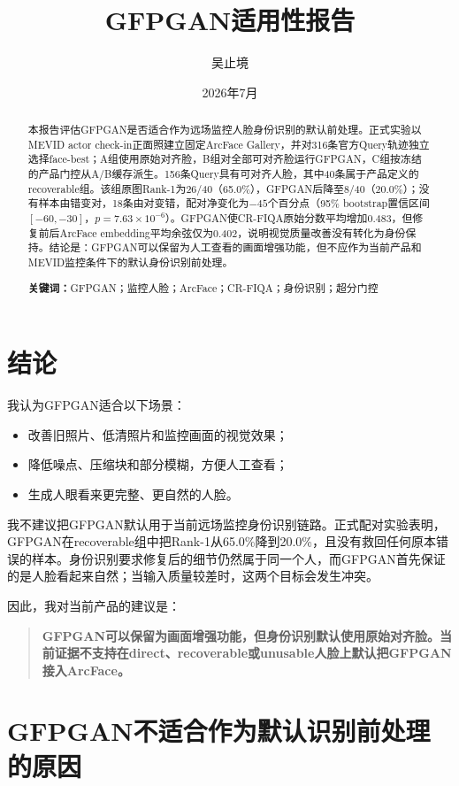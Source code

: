 \documentclass[UTF8,a4paper,11pt]{ctexart}
\title{\textbf{GFPGAN适用性报告}}
\author{吴止境}
\date{2026年7月}
\begin{document}
\pagestyle{plain}
\maketitle

\begin{abstract}
本报告评估GFPGAN是否适合作为远场监控人脸身份识别的默认前处理。正式实验以MEVID actor check-in正面照建立固定ArcFace Gallery，并对316条官方Query轨迹独立选择face-best；A组使用原始对齐脸，B组对全部可对齐脸运行GFPGAN，C组按冻结的产品门控从A/B缓存派生。156条Query具有可对齐人脸，其中40条属于产品定义的recoverable组。该组原图Rank-1为26/40（65.0\%），GFPGAN后降至8/40（20.0\%）；没有样本由错变对，18条由对变错，配对净变化为$-45$个百分点（95\% bootstrap置信区间$[-60,-30]$，$p=7.63\times10^{-6}$）。GFPGAN使CR-FIQA原始分数平均增加0.483，但修复前后ArcFace embedding平均余弦仅为0.402，说明视觉质量改善没有转化为身份保持。结论是：GFPGAN可以保留为人工查看的画面增强功能，但不应作为当前产品和MEVID监控条件下的默认身份识别前处理。

\textbf{关键词：}GFPGAN；监控人脸；ArcFace；CR-FIQA；身份识别；超分门控
\end{abstract}

\section{结论}

我认为GFPGAN适合以下场景：

\begin{itemize}[leftmargin=2em]
  \item 改善旧照片、低清照片和监控画面的视觉效果；
  \item 降低噪点、压缩块和部分模糊，方便人工查看；
  \item 生成人眼看来更完整、更自然的人脸。
\end{itemize}

我不建议把GFPGAN默认用于当前远场监控身份识别链路。正式配对实验表明，GFPGAN在recoverable组中把Rank-1从65.0\%降到20.0\%，且没有救回任何原本错误的样本。身份识别要求修复后的细节仍然属于同一个人，而GFPGAN首先保证的是人脸看起来自然；当输入质量较差时，这两个目标会发生冲突。

因此，我对当前产品的建议是：

\begin{quote}
\textbf{GFPGAN可以保留为画面增强功能，但身份识别默认使用原始对齐脸。当前证据不支持在direct、recoverable或unusable人脸上默认把GFPGAN接入ArcFace。}
\end{quote}

\section{GFPGAN不适合作为默认识别前处理的原因}
\end{document}
